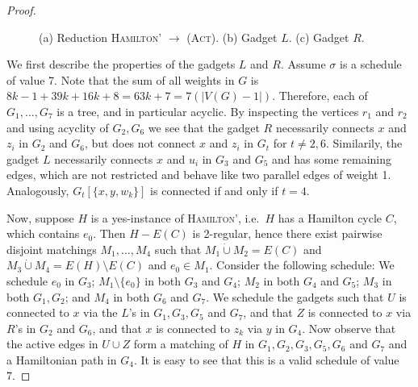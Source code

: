 \documentclass[runningheads]{llncs}
\numberwithin{equation}{section}
\newcommand{\set}[1]{\{ #1 \}}
\newcommand{\dotunion}{\mathbin{\dot{\cup}}}
\newcommand{\act}{\textsc{(Act)}}
\begin{document}
\begin{proof}
\begin{figure}[htpb]
\caption{(a) Reduction \textsc{Hamilton'} $\rightarrow$ \act. (b) Gadget $L$. (c) Gadget $R$.}
\label{fig_act_hamilton_cycle}
\end{figure}

We first describe the properties of the gadgets $L$ and $R$. Assume $\sigma$ is a schedule of value 7. Note that the sum of all weights in $G$ is $8k - 1 + 39k + 16k + 8 = 63k + 7 = 7(|V(G) - 1|)$. Therefore, each of $G_{1}, \ldots, G_{7}$ is a tree, and in particular acyclic. By inspecting the vertices $r_1$ and $r_2$ and using acyclity of $G_2, G_6$ we see that the gadget $R$ necessarily connects $x$ and $z_i$ in $G_2$ and $G_6$, but does not connect $x$ and $z_i$ in $G_t$ for $t \neq 2,6$. Similarily, the gadget $L$ necessarily connects $x$ and $u_i$ in $G_3$ and $G_5$ and has some remaining edges, which are not restricted and behave like two parallel edges of weight 1. Analogously, $G_{t}[\set{x, y, w_k}]$ is connected if and only if $t = 4$.

Now, suppose $H$ is a yes-instance of \textsc{Hamilton'}, i.e.\ $H$ has a Hamilton cycle $C$, which contains $e_0$. Then $H - E(C)$ is 2-regular, hence there exist pairwise disjoint matchings $M_1, \ldots, M_4$ such that $M_1 \dotunion M_2 = E(C)$ and $M_3 \dotunion M_4 = E(H) \setminus E(C)$ and $e_0 \in M_1$. Consider the following schedule: We schedule $e_0$ in $G_3$; $M_1 \setminus \set{e_0}$ in both $G_3$ and $G_4$; $M_2$ in both $G_4$ and $G_5$; $M_3$ in both $G_1, G_2$; and $M_4$ in both $G_6$ and $G_7$. We schedule the gadgets such that $U$ is connected to $x$ via the $L$'s in $G_1, G_3, G_5$ and $G_7$, and that $Z$ is connected to $x$ via $R$'s in $G_2$ and $G_6$, and that $x$ is connected to $z_k$ via $y$ in $G_4$. Now observe that the active edges in $U \cup Z$ form a matching of $H$ in $G_1, G_2, G_3, G_5, G_6$ and $G_7$ and a Hamiltonian path in $G_4$. It is easy to see that this is a valid schedule of value 7. 


\end{proof}
\end{document}
